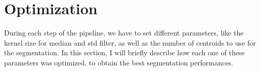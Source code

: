 \documentclass{standalone}
\begin{document}
	\section{Optimization}
	
	During each step of the pipeline, we have to set different parameters, like the kernel size for median and std filter, as well as the number of centroids to use for the segmentation. In this section, I will briefly describe how each one of these parameters was optimized, to obtain the best segmentation performances.
	
\end{document}
